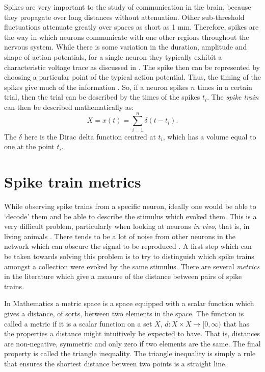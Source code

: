 Spikes are very important to the study of communication in the brain, because they propagate over long distances without 
attenuation. Other sub-threshold fluctuations attenuate greatly over spaces as short as 1 mm. Therefore, spikes are the way in which neurons communicate with one other regions 
throughout the nervous system.  While there is some variation in 
the duration, amplitude and shape of action potentials, for a single neuron they typically exhibit a characteristic voltage trace as discussed in \citep{Lewicki1998a}. The spike then can be represented by choosing a particular point of the typical action potential. Thus, the timing of the spikes give much of the information \citep{BiPoo1998a,Bair1999a}.  So, 
if a neuron spikes $n$ times in a certain trial, then the trial can be 
described by the times of the spikes $t_i$.  The 
\emph{spike train} can then be described mathematically as:
\begin{equation}
X = x(t) = \sum_{i=1}^n \delta(t-t_i).
\end{equation}
The $\delta$ here is the Dirac delta function centred at $t_i$, which has a volume equal to 
one at the point $t_i$.

\section{Spike train metrics}

While observing spike trains from a specific neuron, ideally one would be able to 
\lq{}decode\rq{} them and be able to describe the stimulus which evoked them.  
This is a very difficult problem, particularly when looking at neurons \emph{in vivo}, that is, in living animals \citep{AverbeckEtAl2006a}. There tends to be a lot of noise from other neurons in the network which can obscure the signal to be reproduced \citep{Hopfield1982a}.  A first step which can be taken towards solving this problem is to try to distinguish which spike trains amongst a collection were evoked by 
the same stimulus.  There are several \emph{metrics} in the 
literature which give a measure of the distance between pairs of spike trains.  

In Mathematics a metric space is a space equipped with a scalar function which gives a  
distance, of sorts, between two elements in the space.  The function is called a metric if it is a scalar function on a set 
$X$, $d: X\times X \rightarrow [0,\infty )$ that has the properties a distance might intuitively be expected to have. That is, distances are non-negative, 
symmetric and only zero if two elements are the same. The final property is called the triangle inequality.
 The triangle inequality is simply a rule that ensures the shortest 
distance between two points is a straight line.

